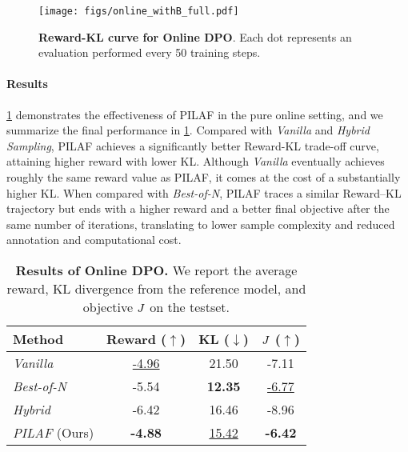 \begin{figure}[htb]
    \centering
    \texttt{[image: figs/online\_withB\_full.pdf]}
    \caption{\textbf{Reward-KL curve for Online DPO}. Each dot represents an evaluation performed every 50 training steps.
    }
    \label{fig:online_dpo}
\end{figure}

\paragraph{Results} \cref{fig:online_dpo} demonstrates the effectiveness of PILAF in the pure online setting, and we summarize the final performance in \cref{tab:online_DPO}. Compared with \textit{Vanilla} and \textit{Hybrid Sampling}, PILAF achieves a significantly better Reward-KL trade-off curve, attaining higher reward with lower KL. Although \textit{Vanilla} eventually achieves roughly the same reward value as PILAF, it comes at the cost of a substantially higher KL. 
When compared with \textit{Best-of-N},  PILAF traces a similar Reward–KL trajectory but ends with a higher reward and a better final objective after the same number of iterations, translating to lower sample complexity and reduced annotation and computational cost.



\begin{table}[h]
\vspace{-10.5pt}
    \caption{\textbf{Results of Online DPO.} We report the average reward, KL divergence from the reference model, and objective $J$ on the testset. }
    \label{tab:online_DPO}
    \vskip 0.2in
    \centering
\begin{small}
\begin{sc}
    \begin{tabular}{l|ccc}
    \toprule
        \textbf{Method} & Reward ($\uparrow$) & KL ($\downarrow$) & $J$ ($\uparrow$)\\ 
        \midrule
        \textit{Vanilla} & \underline{-4.96} & 21.50 & -7.11 \\
        \textit{Best-of-N} & -5.54 & \textbf{12.35}  & \underline{-6.77}\\
        \textit{Hybrid} & -6.42 & 16.46 & -8.96 \\
        \midrule
        \textit{PILAF} (Ours) & \textbf{-4.88} & \underline{15.42} & \textbf{-6.42} \\
    \bottomrule
    \end{tabular}
\end{sc}
\end{small}
\end{table}

